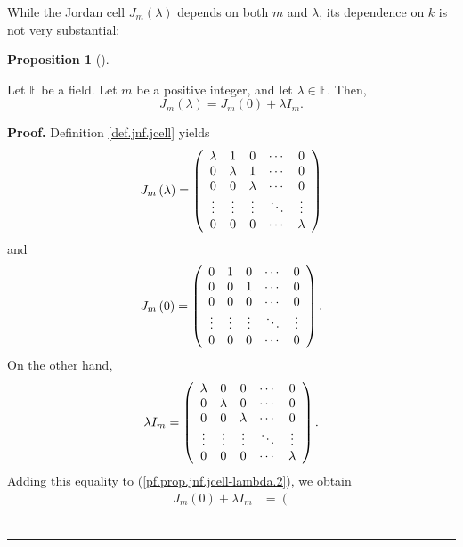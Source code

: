 \documentclass[numbers=enddot,12pt,final,onecolumn,notitlepage]{scrartcl}%
\numberwithin{exer}{subsection}
\theoremstyle{definition}
\newtheorem{prop}[theo]{Proposition}
\newenvironment{proposition}[1][]
{\begin{prop}[#1]\begin{leftbar}}
{\end{leftbar}\end{prop}}
\newenvironment{proof}[1][Proof]{\noindent\textbf{#1.} }{\ \rule{0.5em}{0.5em}}
\begin{document}
While the Jordan cell $J_{m}\left(  \lambda\right)  $ depends on both $m$ and
$\lambda$, its dependence on $k$ is not very substantial:

\begin{proposition}
\label{prop.jnf.jcell-lambda}Let $\mathbb{F}$ be a field. Let $m$ be a
positive integer, and let $\lambda\in\mathbb{F}$. Then,%
\[
J_{m}\left(  \lambda\right)  =J_{m}\left(  0\right)  +\lambda I_{m}.
\]

\end{proposition}

\begin{proof}
Definition \ref{def.jnf.jcell} yields%
\begin{equation}
J_{m}\left(  \lambda\right)  =\left(
\begin{array}
[c]{ccccc}%
\lambda & 1 & 0 & \cdots & 0\\
0 & \lambda & 1 & \cdots & 0\\
0 & 0 & \lambda & \cdots & 0\\
\vdots & \vdots & \vdots & \ddots & \vdots\\
0 & 0 & 0 & \cdots & \lambda
\end{array}
\right)  \label{pf.prop.jnf.jcell-lambda.1}%
\end{equation}
and%
\begin{equation}
J_{m}\left(  0\right)  =\left(
\begin{array}
[c]{ccccc}%
0 & 1 & 0 & \cdots & 0\\
0 & 0 & 1 & \cdots & 0\\
0 & 0 & 0 & \cdots & 0\\
\vdots & \vdots & \vdots & \ddots & \vdots\\
0 & 0 & 0 & \cdots & 0
\end{array}
\right)  . \label{pf.prop.jnf.jcell-lambda.2}%
\end{equation}
On the other hand,%
\[
\lambda I_{m}=\left(
\begin{array}
[c]{ccccc}%
\lambda & 0 & 0 & \cdots & 0\\
0 & \lambda & 0 & \cdots & 0\\
0 & 0 & \lambda & \cdots & 0\\
\vdots & \vdots & \vdots & \ddots & \vdots\\
0 & 0 & 0 & \cdots & \lambda
\end{array}
\right)  .
\]
Adding this equality to (\ref{pf.prop.jnf.jcell-lambda.2}), we obtain%
\begin{align*}
J_{m}\left(  0\right)  +\lambda I_{m}  &  =\left(

\end{align*}
\end{proof}
\end{document}
